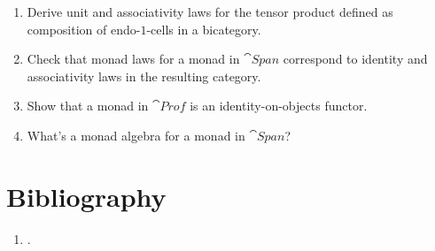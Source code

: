 \begin{enumerate}
	\tightlist
	\item
	      Derive unit and associativity laws for the tensor product defined as
	      composition of endo-$1$-cells in a bicategory.
	\item
	      Check that monad laws for a monad in $\cat{Span}$ correspond to
	      identity and associativity laws in the resulting category.
	\item
	      Show that a monad in $\cat{Prof}$ is an identity-on-objects functor.
	\item
	      What's a monad algebra for a monad in $\cat{Span}$?
\end{enumerate}

\section{Bibliography}
\begin{enumerate}
	\tightlist
	\item
	      .
\end{enumerate}
